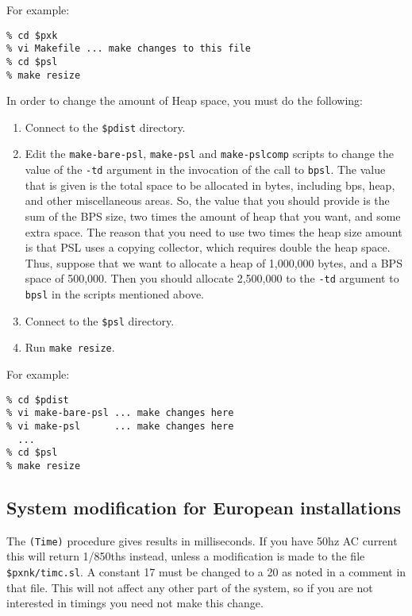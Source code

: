 \noindent For example:

\begin{verbatim}
% cd $pxk
% vi Makefile ... make changes to this file
% cd $psl
% make resize
\end{verbatim}

In order to change the amount of Heap space, you must do the
following:

\begin{enumerate}

\item Connect to the {\tt \$pdist} directory.

\item Edit the {\tt make-bare-psl}, {\tt make-psl} and {\tt make-pslcomp}
scripts to change the value of the {\tt -td} argument in the
invocation of the call to {\tt bpsl}.  The value that is given is the
total space to be allocated in bytes, including bps, heap, and other
miscellaneous areas.  So, the value that you should provide is the sum
of the BPS size, two times the amount of heap that you want, and some
extra space.  The reason that you need to use two times the heap size
amount is that PSL uses a copying collector, which requires double the
heap space.  Thus, suppose that we want to allocate a heap of
1,000,000 bytes, and a BPS space of 500,000.  Then you should allocate
2,500,000 to the {\tt -td} argument to {\tt bpsl} in the scripts
mentioned above.

\item Connect to the {\tt \$psl} directory.

\item Run {\tt make resize}.

\end{enumerate}

\noindent For example:

\begin{verbatim}
% cd $pdist
% vi make-bare-psl ... make changes here
% vi make-psl      ... make changes here
  ...
% cd $psl
% make resize
\end{verbatim}

\subsection{System modification for European installations}

The {\tt (Time)} procedure gives results in milliseconds.  If you have 50hz
AC current this will return 1/850ths instead, unless a modification is
made to the file {\tt \$pxnk/timc.sl}.  A constant 17 must be changed
to a 20 as noted in a comment in that file.  This will not affect any
other part of the system, so if you are not interested in timings you
need not make this change.

